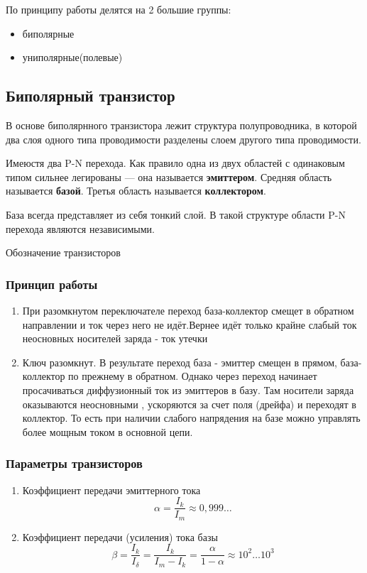 \documentclass[../main.tex]{subfiles}
\begin{document}
По принципу работы делятся на 2 большие группы:
\begin{itemize}
    \item биполярные
    \item униполярные(полевые)
\end{itemize}

\subsection{Биполярный транзистор}
В основе биполярнного транзистора лежит структура полупроводника, в которой два слоя одного типа проводимости разделены 
слоем другого типа проводимости.

Имеюстя два P-N перехода. Как правило одна из двух областей с одинаковым типом сильнее легированы --- она называется \textbf{эмиттером}.
Средняя область называется \textbf{базой}. Третья область называется \textbf{коллектором}.

База всегда представляет из себя тонкий слой. В такой структуре области P-N перехода являются независимыми.

Обозначение транзисторов

\subsubsection{Принцип работы}

\begin{enumerate}
    \item При разомкнутом переключателе переход база-коллектор смещет в обратном направлении и ток через него не идёт.Вернее идёт только
    крайне слабый ток неосновных носителей заряда - ток утечки
    \item Ключ разомкнут. В результате переход база - эмиттер смещен в прямом, база-коллектор по прежнему в обратном. Однако
    через переход начинает просачиваться диффузионный ток из эмиттеров в базу. Там носители заряда оказываются неосновными ,
    ускоряются за счет поля (дрейфа) и переходят в коллектор. То есть при наличии слабого напрядения на базе можно управлять
    более мощным током в основной цепи.
\end{enumerate}

\subsubsection{Параметры транзисторов}

\begin{enumerate}
    \item Коэффициент передачи эмиттерного тока
    \[\alpha = \frac{I_k}{I_m} \approx 0,999\ldots\]
    \item Коэффициент передачи (усиления) тока базы
    \[\beta = \frac{I_k}{I_{\delta}} = \frac{I_k}{I_m - I_k} = \frac{\alpha}{1 - \alpha} \approx 10^2 \ldots 10^3\]
\end{enumerate}
\end{document}
